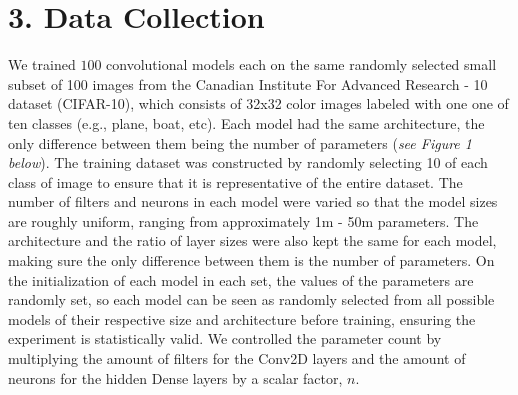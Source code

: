 \documentclass[12pt]{article}
\begin{document}
    \section*{3. Data Collection}

    We trained $100$ convolutional models each on the same randomly selected small subset of 100 images
    from the Canadian Institute For Advanced Research - 10 dataset (CIFAR-10), which consists of 32x32 color images labeled with one one of ten classes (e.g., plane, boat, etc).
    Each model had the same architecture, the only difference between them being the number of parameters (\textit{see Figure 1 below}).
    The training dataset was constructed by randomly selecting 10 of each class of image to ensure that it is representative of the entire dataset.
    The number of filters and neurons in each model were varied so that the model sizes are roughly uniform, ranging from approximately 1m - 50m parameters.
    The architecture and the ratio of layer sizes were also kept the same for each model, making sure the only difference between them is the number of parameters.
    On the initialization of each model in each set, the values of the parameters are randomly set, so each model can be seen as randomly
    selected from all possible models of their respective size and architecture before training, ensuring the experiment is statistically valid.
    We controlled the parameter count by multiplying the amount of filters for the Conv2D layers and the amount of neurons
    for the hidden Dense layers by a scalar factor, $n$.
\end{document}
